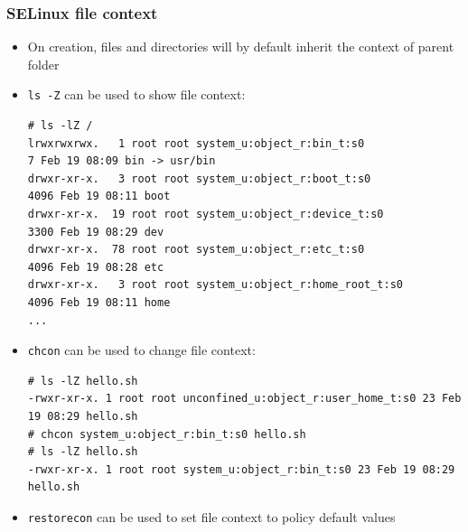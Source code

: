 \begin{frame}[fragile]
	\frametitle{SELinux file context}
	\begin{itemize}
		\item On creation, files and directories will by default inherit the context
			of parent folder
		\item \texttt{ls -Z} can be used to show file context:
			\begin{block}{}
				{\tiny
				\begin{verbatim}
# ls -lZ /
lrwxrwxrwx.   1 root root system_u:object_r:bin_t:s0                   7 Feb 19 08:09 bin -> usr/bin
drwxr-xr-x.   3 root root system_u:object_r:boot_t:s0               4096 Feb 19 08:11 boot
drwxr-xr-x.  19 root root system_u:object_r:device_t:s0             3300 Feb 19 08:29 dev
drwxr-xr-x.  78 root root system_u:object_r:etc_t:s0                4096 Feb 19 08:28 etc
drwxr-xr-x.   3 root root system_u:object_r:home_root_t:s0          4096 Feb 19 08:11 home
...
\end{verbatim}
}
			\end{block}
		\item \texttt{chcon} can be used to change file context:
			\begin{block}{}
				{\tiny
				\begin{verbatim}
# ls -lZ hello.sh
-rwxr-xr-x. 1 root root unconfined_u:object_r:user_home_t:s0 23 Feb 19 08:29 hello.sh
# chcon system_u:object_r:bin_t:s0 hello.sh
# ls -lZ hello.sh
-rwxr-xr-x. 1 root root system_u:object_r:bin_t:s0 23 Feb 19 08:29 hello.sh
\end{verbatim}
}
			\end{block}
		\item \texttt{restorecon} can be used to set file context to policy default
			values
	\end{itemize}
\end{frame}

